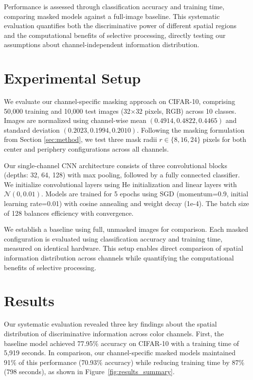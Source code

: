 \documentclass{article} %
\begin{document}
Performance is assessed through classification accuracy and training time, comparing masked models against a full-image baseline. This systematic evaluation quantifies both the discriminative power of different spatial regions and the computational benefits of selective processing, directly testing our assumptions about channel-independent information distribution.

\section{Experimental Setup}
\label{sec:experimental}

We evaluate our channel-specific masking approach on CIFAR-10, comprising 50,000 training and 10,000 test images (32$\times$32 pixels, RGB) across 10 classes. Images are normalized using channel-wise mean $(0.4914, 0.4822, 0.4465)$ and standard deviation $(0.2023, 0.1994, 0.2010)$. Following the masking formulation from Section \ref{sec:method}, we test three mask radii $r \in \{8, 16, 24\}$ pixels for both center and periphery configurations across all channels.

Our single-channel CNN architecture consists of three convolutional blocks (depths: 32, 64, 128) with max pooling, followed by a fully connected classifier. We initialize convolutional layers using He initialization \citep{He2015DelvingDI} and linear layers with $\mathcal{N}(0, 0.01)$. Models are trained for 5 epochs using SGD (momentum=0.9, initial learning rate=0.01) with cosine annealing and weight decay (1e-4). The batch size of 128 balances efficiency with convergence.

We establish a baseline using full, unmasked images for comparison. Each masked configuration is evaluated using classification accuracy and training time, measured on identical hardware. This setup enables direct comparison of spatial information distribution across channels while quantifying the computational benefits of selective processing.

\section{Results}
\label{sec:results}

Our systematic evaluation revealed three key findings about the spatial distribution of discriminative information across color channels. First, the baseline model achieved 77.95\% accuracy on CIFAR-10 with a training time of 5,919 seconds. In comparison, our channel-specific masked models maintained 91\% of this performance (70.93\% accuracy) while reducing training time by 87\% (798 seconds), as shown in Figure~\ref{fig:results_summary}.
\end{document}
